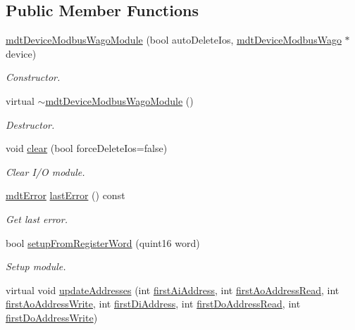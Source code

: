 \subsection*{Public Member Functions}
\begin{DoxyCompactItemize}
\item 
\hyperlink{classmdt_device_modbus_wago_module_a888f4d413d3bde075733ddbba4ae7d96}{mdt\-Device\-Modbus\-Wago\-Module} (bool auto\-Delete\-Ios, \hyperlink{classmdt_device_modbus_wago}{mdt\-Device\-Modbus\-Wago} $\ast$device)
\begin{DoxyCompactList}\small\item\em Constructor. \end{DoxyCompactList}\item 
virtual \hyperlink{classmdt_device_modbus_wago_module_af47e8774515e5960ffb87bc6ec81cea2}{$\sim$mdt\-Device\-Modbus\-Wago\-Module} ()
\begin{DoxyCompactList}\small\item\em Destructor. \end{DoxyCompactList}\item 
void \hyperlink{classmdt_device_modbus_wago_module_a7f874ff01aa984101b1d867c781eba67}{clear} (bool force\-Delete\-Ios=false)
\begin{DoxyCompactList}\small\item\em Clear I/\-O module. \end{DoxyCompactList}\item 
\hyperlink{classmdt_error}{mdt\-Error} \hyperlink{classmdt_device_modbus_wago_module_a43ba3822bf5469205737c39ac89ee171}{last\-Error} () const 
\begin{DoxyCompactList}\small\item\em Get last error. \end{DoxyCompactList}\item 
bool \hyperlink{classmdt_device_modbus_wago_module_adf7431cd4d41d7839b42cc21badeabc5}{setup\-From\-Register\-Word} (quint16 word)
\begin{DoxyCompactList}\small\item\em Setup module. \end{DoxyCompactList}\item 
virtual void \hyperlink{classmdt_device_modbus_wago_module_ac7d9da94e7d4c06e288a346ac123c711}{update\-Addresses} (int \hyperlink{classmdt_device_modbus_wago_module_a502dc2388ecf0531786c09964b4f7566}{first\-Ai\-Address}, int \hyperlink{classmdt_device_modbus_wago_module_acd623a8d9956fd79c11c01879afdc73c}{first\-Ao\-Address\-Read}, int \hyperlink{classmdt_device_modbus_wago_module_af8b6d9549c820869b09a77ae01e9bf3f}{first\-Ao\-Address\-Write}, int \hyperlink{classmdt_device_modbus_wago_module_a2229734519a6168e459115a87c7caa5c}{first\-Di\-Address}, int \hyperlink{classmdt_device_modbus_wago_module_ac7279bc692cba522a5e06abfec5012a9}{first\-Do\-Address\-Read}, int \hyperlink{classmdt_device_modbus_wago_module_a31165c5734801029ea530be8774da5de}{first\-Do\-Address\-Write})

\end{DoxyCompactItemize}
